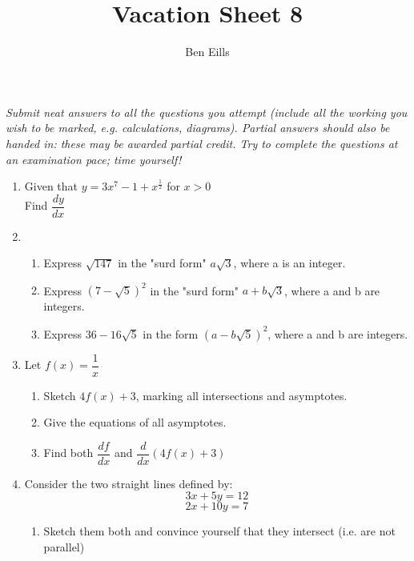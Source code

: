 \documentclass{article}
\begin{document}
\title{Vacation Sheet 8}
\author{Ben Eills}
\maketitle

\textit{Submit neat answers to all the questions you attempt (include all the working you wish to be marked, e.g. calculations, diagrams).  Partial answers should also be handed in: these may be awarded partial credit.  Try to complete the questions at an examination pace; time yourself!}

\begin{enumerate}
	\item Given that $y = 3x^7 - 1 + x^{\frac{1}{2}}$ for $x > 0$ \\
			Find $\dfrac{dy}{dx}$
	
	
	\item 
	
		\begin{enumerate}
			\item Express $\sqrt{147}$ in the "surd form" $a \sqrt{3}$, where a is an integer.
			
			\item Express $(7 - \sqrt{5})^2$ in the "surd form" $a + b \sqrt{3}$, where a and b are integers.	
			
			\item Express $36 - 16 \sqrt{5}$ in the form $(a - b \sqrt{5})^2$, where a and b are integers.
		\end{enumerate}


	\item Let $f(x) = \dfrac{1}{x}$
	
		\begin{enumerate}
			\item Sketch $4f(x) + 3$, marking all intersections and asymptotes.
			
			\item Give the equations of all asymptotes.
			
			\item Find both $\dfrac{df}{dx}$ and $\dfrac{d}{dx} (4f(x) + 3)$
		\end{enumerate}

	
	\item Consider the two straight lines defined by:
			$$ 3x + 5y = 12 $$
			$$ 2x + 10y = 7 $$
			
		\begin{enumerate}
			\item Sketch them both and convince yourself that they intersect (i.e. are not parallel)
			

\end{enumerate}
\end{enumerate}
\end{document}
